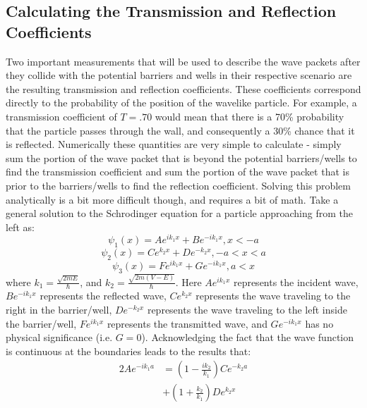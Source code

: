 \documentclass[twocolumn]{article}
\begin{document}
\subsection{Calculating the Transmission and Reflection Coefficients}
\hspace{\parindent}Two important measurements that will be used to describe the wave packets after they collide with the potential barriers and wells in their respective scenario are the resulting transmission and reflection coefficients. These coefficients correspond directly to the probability of the position of the wavelike particle. For example, a transmission coefficient of $T=.70$ would mean that there is a 70\% probability that the particle passes through the wall, and consequently a 30\% chance that it is reflected. Numerically these quantities are very simple to calculate - simply sum the portion of the wave packet that is beyond the potential barriers/wells to find the transmission coefficient and sum the portion of the wave packet that is prior to the barriers/wells to find the reflection coefficient. Solving this problem analytically is a bit more difficult though, and requires a bit of math. Take a general solution to the Schrodinger equation for a particle approaching from the left as:
\begin{equation}
	\psi_1(x)= Ae^{ik_1x}+Be^{-ik_1x}, x<-a
\end{equation}
\begin{equation}
	\psi_2(x)= Ce^{k_2x}+De^{-k_2x}, -a<x<a
\end{equation}
\begin{equation}
	\psi_3(x)= Fe^{ik_1x}+Ge^{-ik_1x}, a<x
\end{equation}
where $k_1=\frac{\sqrt{2mE}}{\hbar}$, and $k_2=\frac{\sqrt{2m(V-E)}}{\hbar}$. Here $Ae^{ik_1x}$ represents the incident wave, $Be^{-ik_1x}$ represents the reflected wave, $Ce^{k_2x}$ represents the wave traveling to the right in the barrier/well,  $De^{-k_2x}$ represents the wave traveling to the left inside the barrier/well, $Fe^{ik_1x}$ represents the transmitted wave, and $Ge^{-ik_1x}$ has no physical significance (i.e. $G=0$). Acknowledging the fact that the wave function is continuous at the boundaries leads to the results that:
\begin{equation}
\begin{split}
	2Ae^{-ik_1a}&=\left(1-\frac{ik_2}{k_1}\right)Ce^{-k_2a} \\
	&+\left(1+\frac{k_2}{k_1}\right)De^{k_2x}
	\end{split}
\end{equation}
\end{document}
